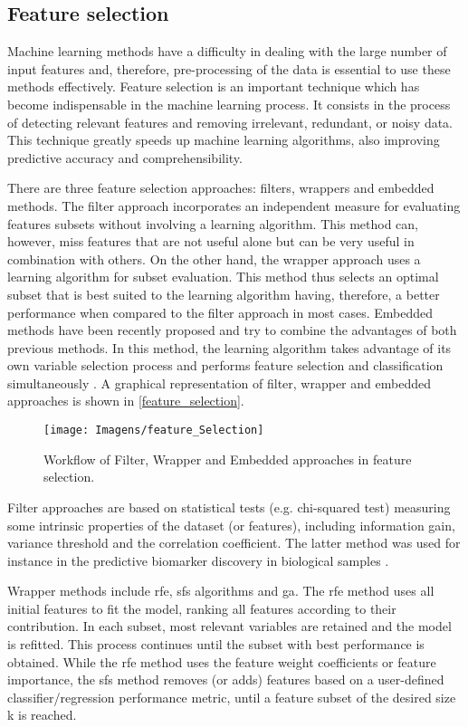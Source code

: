 
\subsection{Feature selection}

Machine learning methods have a difficulty in dealing with the large number of input features and, therefore, pre-processing of the data is essential to use these methods effectively. Feature selection is an important technique which has become indispensable in the machine learning process. It consists in   the process of detecting relevant features and removing irrelevant, redundant, or noisy data. This technique greatly speeds up machine learning algorithms, also improving predictive accuracy and comprehensibility.

There are three feature selection approaches: filters, wrappers and embedded methods. The filter approach incorporates an independent measure for evaluating features subsets without involving a learning algorithm. This method can, however, miss features that are not useful alone but can be very useful in combination with others. On the other hand, the wrapper approach uses a learning algorithm for subset evaluation. This method thus selects an optimal subset that is best suited to the learning algorithm having, therefore, a better performance when compared to the filter approach in most cases. Embedded methods have been recently proposed and try to combine the advantages of both previous methods. In this method, the learning algorithm takes advantage of its own variable selection process and performs feature selection and classification simultaneously \citep{kumar2014feature}. A graphical representation of filter, wrapper and embedded approaches is shown in \autoref{feature_selection}.


\begin{figure}[!htb]
	\centering
	\texttt{[image: Imagens/feature\_Selection]}
	\caption{Workflow of Filter, Wrapper and Embedded approaches in feature selection.}
	\label{feature_selection}
\end{figure}

Filter approaches are based on statistical tests (e.g. chi-squared test) measuring some intrinsic properties of the dataset (or features), including information gain, variance threshold and the correlation coefficient. The latter method was used for instance in the predictive biomarker discovery in biological samples \citep{grissa2016feature}.

Wrapper methods include \gls{rfe}, \gls{sfs} algorithms and \gls{ga}. The \gls{rfe} method uses all initial features to fit the model, ranking all features according to their contribution. In each subset, most relevant variables are retained and the model is refitted. This process continues until the subset with best performance is obtained. While the \gls{rfe} method uses the feature weight coefficients or feature importance, the \gls{sfs} method removes (or adds) features based on a user-defined classifier/regression performance metric, until a feature subset of the desired size k is reached. 

